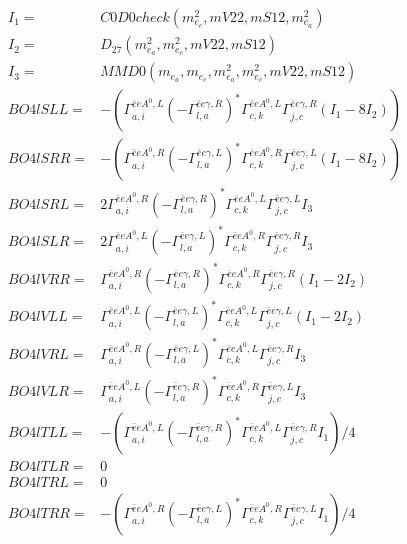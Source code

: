 \documentclass[A4,landscape]{article}
\begin{document}
\begin{align} 
I_1 = & C0D0check(m^2_{e_{{c}}}, mV22, mS12, m^2_{e_{{a}}}) \\ 
I_2 = & D_{27}(m^2_{e_{{a}}}, m^2_{e_{{c}}}, mV22, mS12) \\ 
I_3 = & MMD0(m_{e_{{a}}}, m_{e_{{c}}}, m^2_{e_{{a}}}, m^2_{e_{{c}}}, mV22, mS12) \\ 
  BO4lSLL= & -( \Gamma^{\bar{e}e A^0 ,L}_{a, i} (- \Gamma^{\bar{e}e \gamma ,R} _{l, a})^* \Gamma^{\bar{e}e A^0 ,L}_{c, k} \Gamma^{\bar{e}e \gamma ,R}_{j, c} (I_1 - 8 I_2)) \\ 
  BO4lSRR= & -( \Gamma^{\bar{e}e A^0 ,R}_{a, i} (- \Gamma^{\bar{e}e \gamma ,L} _{l, a})^* \Gamma^{\bar{e}e A^0 ,R}_{c, k} \Gamma^{\bar{e}e \gamma ,L}_{j, c} (I_1 - 8 I_2)) \\ 
  BO4lSRL= & 2  \Gamma^{\bar{e}e A^0 ,R}_{a, i} (- \Gamma^{\bar{e}e \gamma ,R} _{l, a})^* \Gamma^{\bar{e}e A^0 ,L}_{c, k} \Gamma^{\bar{e}e \gamma ,L}_{j, c} I_3 \\ 
  BO4lSLR= & 2  \Gamma^{\bar{e}e A^0 ,L}_{a, i} (- \Gamma^{\bar{e}e \gamma ,L} _{l, a})^* \Gamma^{\bar{e}e A^0 ,R}_{c, k} \Gamma^{\bar{e}e \gamma ,R}_{j, c} I_3 \\ 
  BO4lVRR= &  \Gamma^{\bar{e}e A^0 ,R}_{a, i} (- \Gamma^{\bar{e}e \gamma ,R} _{l, a})^* \Gamma^{\bar{e}e A^0 ,R}_{c, k} \Gamma^{\bar{e}e \gamma ,R}_{j, c} (I_1 - 2 I_2) \\ 
  BO4lVLL= &  \Gamma^{\bar{e}e A^0 ,L}_{a, i} (- \Gamma^{\bar{e}e \gamma ,L} _{l, a})^* \Gamma^{\bar{e}e A^0 ,L}_{c, k} \Gamma^{\bar{e}e \gamma ,L}_{j, c} (I_1 - 2 I_2) \\ 
  BO4lVRL= &  \Gamma^{\bar{e}e A^0 ,R}_{a, i} (- \Gamma^{\bar{e}e \gamma ,L} _{l, a})^* \Gamma^{\bar{e}e A^0 ,L}_{c, k} \Gamma^{\bar{e}e \gamma ,R}_{j, c} I_3 \\ 
  BO4lVLR= &  \Gamma^{\bar{e}e A^0 ,L}_{a, i} (- \Gamma^{\bar{e}e \gamma ,R} _{l, a})^* \Gamma^{\bar{e}e A^0 ,R}_{c, k} \Gamma^{\bar{e}e \gamma ,L}_{j, c} I_3 \\ 
  BO4lTLL= & -( \Gamma^{\bar{e}e A^0 ,L}_{a, i} (- \Gamma^{\bar{e}e \gamma ,R} _{l, a})^* \Gamma^{\bar{e}e A^0 ,L}_{c, k} \Gamma^{\bar{e}e \gamma ,R}_{j, c} I_1)/4 \\ 
  BO4lTLR= & 0 \\ 
  BO4lTRL= & 0 \\ 
  BO4lTRR= & -( \Gamma^{\bar{e}e A^0 ,R}_{a, i} (- \Gamma^{\bar{e}e \gamma ,L} _{l, a})^* \Gamma^{\bar{e}e A^0 ,R}_{c, k} \Gamma^{\bar{e}e \gamma ,L}_{j, c} I_1)/4 \\ 
\end{align} 
\end{document}
